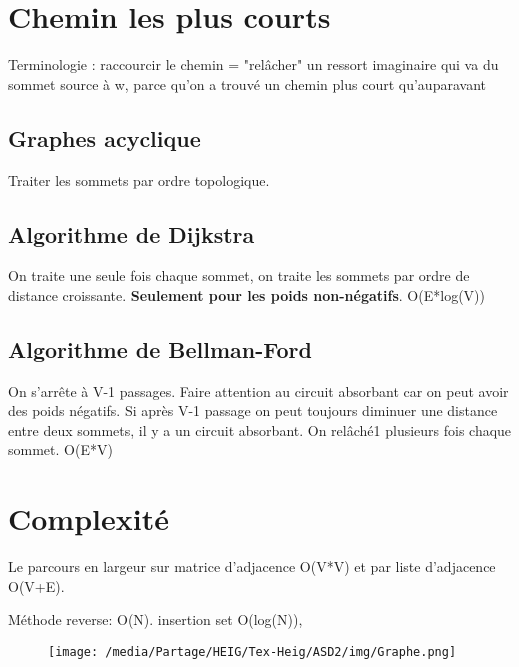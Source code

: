 \documentclass[
]{article}
\begin{document}
\hypertarget{header-n105}{%
\section{Chemin les plus courts }\label{header-n105}}

Terminologie : raccourcir le chemin = "relâcher" un ressort imaginaire
qui va du sommet source à w, parce qu'on a trouvé un chemin plus court
qu'auparavant

\hypertarget{header-n107}{%
\subsection{Graphes acyclique }\label{header-n107}}

Traiter les sommets par ordre topologique.

\hypertarget{header-n109}{%
\subsection{Algorithme de Dijkstra}\label{header-n109}}

On traite une seule fois chaque sommet, on traite les sommets par ordre
de distance croissante. \textbf{Seulement pour les poids non-négatifs}.
O(E*log(V))

\hypertarget{header-n111}{%
\subsection{Algorithme de Bellman-Ford}\label{header-n111}}

On s'arrête à V-1 passages. Faire attention au circuit absorbant car on
peut avoir des poids négatifs. Si après V-1 passage on peut toujours
diminuer une distance entre deux sommets, il y a un circuit absorbant.
On relâché1 plusieurs fois chaque sommet. O(E*V)

\hypertarget{header-n113}{%
\section{Complexité }\label{header-n113}}

Le parcours en largeur sur matrice d'adjacence O(V*V) et par liste
d'adjacence O(V+E).

Méthode reverse: O(N). insertion set O(log(N)),

\begin{figure}
\centering
\texttt{[image: /media/Partage/HEIG/Tex-Heig/ASD2/img/Graphe.png]}
\caption{}
\end{figure}
\end{document}
